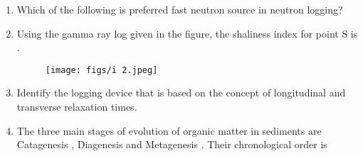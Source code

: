 \documentclass[journal]{IEEEtran}
\begin{document}
\begin{enumerate}
    \hfill{}
    
    \item Which of the following is preferred fast neutron source in neutron logging?
    \begin{enumerate}  \end{enumerate}              
    \hfill{}
    \item Using the gamma ray log given in the figure, the shaliness index for point S is .
    \begin{figure}
        \centering
        \texttt{[image: figs/i 2.jpeg]}
        \caption{}
        \label{fig:placeholder}
    \end{figure}

    
    \hfill{}
    
    \item Identify the logging device that is based on the concept of longitudinal and transverse relaxation times.
    
    \begin{enumerate}  \end{enumerate}              
    
    \hfill{}
    
    \item The three main stages of evolution of organic matter in sediments are Catagenesis , Diagenesis  and Metagenesis . Their chronological order is  
    
    \begin{enumerate}  \end{enumerate}              
    

\end{enumerate}
\end{document}
